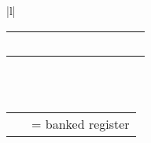 \begin{tabular}{|l|}
\begin{tabular}[b]{|l|c|l|c|l|c|l|c|l|c|l|}
	\hhline{-*{5}{~-}}
	\register{R15} & & \register{R15} & & \register{R15} & & \register{R15} & & \register{R15} & & \register{R15} \\
	\hhline{-*{5}{~-}}
	\multicolumn{1}{c}{} \\
	\hhline{-*{5}{~-}}
	\register{CPSR} & & \register{CPSR} & & \register{CPSR} & & \register{CPSR} & & \register{CPSR} & & \register{CPSR} \\
	\hhline{-*{5}{~-}}
	\multicolumn{1}{c}{} & & \cellcolor{gray!25}\register{SPSR\_fiq} & & \cellcolor{gray!25}\register{SPSR\_svc} & & \cellcolor{gray!25}\register{SPSR\_abt} & & \cellcolor{gray!25}\register{SPSR\_irq} & & \cellcolor{gray!25}\register{SPSR\_und} \\
	\hhline{~*{5}{~-}}
\end{tabular}\\
\\
\ttfamily
\small
\begin{tabular}{ll}\cellcolor{gray!25} \ & = banked register \\ \end{tabular} \\
\\
\hline
\end{tabular}
